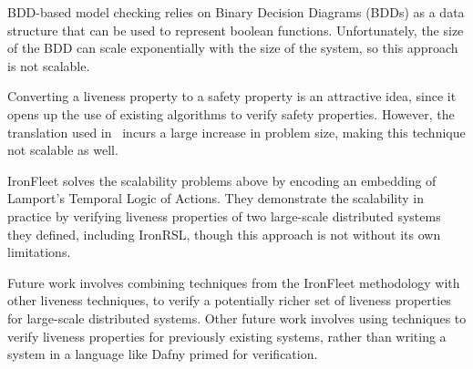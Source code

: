 \documentclass{llncs}
\begin{document}
BDD-based model checking relies on Binary Decision Diagrams (BDDs) as a data
structure that can be used to represent boolean functions. Unfortunately, the
size of the BDD can scale exponentially with the size of the system, so this
approach is not scalable.

Converting a liveness property to a safety property is an attractive idea, since
it opens up the use of existing algorithms to verify safety properties. However,
the translation used in~\cite{Schuppan2006} incurs a large increase in problem
size, making this technique not scalable as well.

IronFleet solves the scalability problems above by encoding an embedding of
Lamport's Temporal Logic of Actions. They demonstrate the scalability in
practice by verifying liveness properties of two large-scale distributed systems
they defined, including IronRSL, though this approach is not without its own
limitations.

Future work involves combining techniques from the IronFleet methodology with
other liveness techniques, to verify a potentially richer set of liveness
properties for large-scale distributed systems. Other future work involves using
techniques to verify liveness properties for previously existing systems, rather
than writing a system in a language like Dafny primed for verification.

%
%



\end{document}
